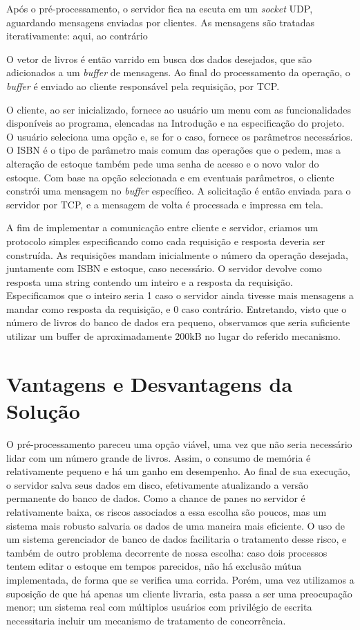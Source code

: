 \documentclass[11pt, brazil]{article} %
\begin{document}
Após o pré-processamento, o servidor fica na escuta em um \emph{socket} UDP, aguardando mensagens enviadas por clientes. As mensagens são tratadas iterativamente: aqui, ao contrário

 
O vetor de livros é então varrido em busca dos dados desejados, que são adicionados a um \emph{buffer} de mensagens.
Ao final do processamento da operação, o \emph{buffer} é enviado ao cliente responsável pela requisição, por TCP.

O cliente, ao ser inicializado, fornece ao usuário um menu com as funcionalidades disponíveis ao programa, elencadas na Introdução e na especificação do projeto. 
O usuário seleciona uma opção e, se for o caso, fornece os parâmetros necessários.
O ISBN é o tipo de parâmetro mais comum das operações que o pedem, mas a alteração de estoque também pede uma senha de acesso e o novo valor do estoque. 
Com base na opção selecionada e em eventuais parâmetros, o cliente constrói uma mensagem no \emph{buffer} específico. 
A solicitação é então enviada para o servidor por TCP, e a mensagem de volta é processada e impressa em tela.

A fim de implementar a comunicação entre cliente e servidor, criamos um protocolo simples especificando como cada requisição e resposta deveria ser
construída. As requisições mandam inicialmente o número da operação desejada, juntamente com ISBN e estoque, caso necessário. O servidor devolve
como resposta
uma string contendo um inteiro e a resposta da requisição. Especificamos que o inteiro seria 1 caso o servidor ainda tivesse mais mensagens
a mandar como resposta da requisição, e 0 caso contrário. Entretando, visto que o número de livros do banco de dados era pequeno, observamos que
seria suficiente utilizar um buffer de aproximadamente 200kB no lugar do referido mecanismo.


\section{Vantagens e Desvantagens da Solução}

O pré-processamento pareceu uma opção viável, uma vez que não seria necessário lidar com um número grande de livros. Assim, o consumo de memória é relativamente pequeno e há um ganho em desempenho. 
Ao final de sua execução, o servidor salva seus dados em disco, efetivamente atualizando a versão permanente do banco de dados.
Como a chance de panes no servidor é relativamente baixa, os riscos associados a essa escolha são poucos, mas um sistema mais robusto salvaria os dados de uma maneira mais eficiente. 
O uso de um sistema gerenciador de banco de dados facilitaria o tratamento desse risco, e também de outro problema decorrente de nossa escolha: caso dois processos tentem editar o estoque em tempos parecidos, não há exclusão mútua implementada, de forma que se verifica uma corrida.
Porém, uma vez utilizamos a suposição de que há apenas um cliente livraria, esta passa a ser uma preocupação menor; um sistema real com múltiplos usuários
com privilégio de escrita necessitaria incluir um mecanismo de tratamento de concorrência.
\end{document}
